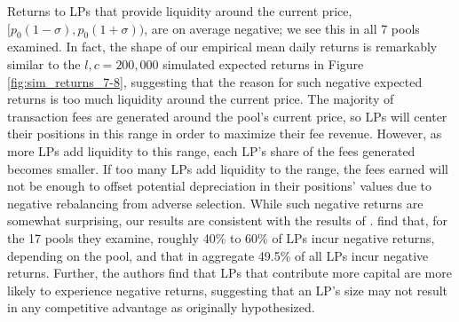 \documentclass[11pt]{article}
\begin{document}
Returns to LPs that provide liquidity around the current price, $[p_0(1 - \sigma), p_0(1 + \sigma))$, are on average negative; we see this in all 7 pools examined. In fact, the shape of our empirical mean daily returns is remarkably similar to the $l, c = 200,000$ simulated expected returns in Figure \ref{fig:sim_returns_7-8}, suggesting that the reason for such negative expected returns is too much liquidity around the current price. The majority of transaction fees are generated around the pool's current price, so LPs will center their positions in this range in order to maximize their fee revenue. However, as more LPs add liquidity to this range, each LP's share of the fees generated becomes smaller. If too many LPs add liquidity to the range, the fees earned will not be enough to offset potential depreciation in their positions' values due to negative rebalancing from adverse selection. While such negative returns are somewhat surprising, our results are consistent with the results of \citet{loesch2021impermanent}. \citet{loesch2021impermanent} find that, for the 17 pools they examine, roughly 40\% to 60\% of LPs incur negative returns, depending on the pool, and that in aggregate 49.5\% of all LPs incur negative returns. Further, the authors find that LPs that contribute more capital are more likely to experience negative returns, suggesting that an LP's size may not result in any competitive advantage as originally hypothesized.
\end{document}
